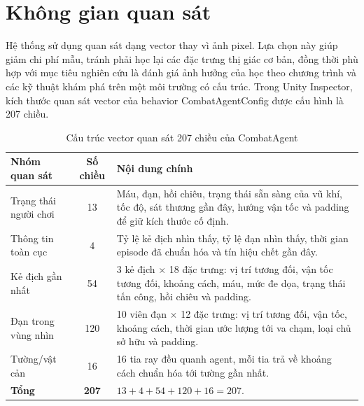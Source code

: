 \section{Không gian quan sát}

Hệ thống sử dụng quan sát dạng vector thay vì ảnh pixel. Lựa chọn này giúp giảm chi phí mẫu, tránh phải học lại các đặc trưng thị giác cơ bản, đồng thời phù hợp với mục tiêu nghiên cứu là đánh giá ảnh hưởng của học theo chương trình và các kỹ thuật khám phá trên một môi trường có cấu trúc. Trong Unity Inspector, kích thước quan sát vector của behavior CombatAgentConfig được cấu hình là 207 chiều.

\begin{table}[H]
    \centering
    \small
    \caption{Cấu trúc vector quan sát 207 chiều của CombatAgent}
    \label{tab:obs_207}
    \begin{tabular}{|p{4cm}|c|p{8cm}|}
        \hline
        \textbf{Nhóm quan sát} & \textbf{Số chiều} & \textbf{Nội dung chính} \\
        \hline
        Trạng thái người chơi & 13 & Máu, đạn, hồi chiêu, trạng thái sẵn sàng của vũ khí, tốc độ, sát thương gần đây, hướng vận tốc và padding để giữ kích thước cố định. \\
        \hline
        Thông tin toàn cục & 4 & Tỷ lệ kẻ địch nhìn thấy, tỷ lệ đạn nhìn thấy, thời gian episode đã chuẩn hóa và tín hiệu chết gần đây. \\
        \hline
        Kẻ địch gần nhất & 54 & 3 kẻ địch $\times$ 18 đặc trưng: vị trí tương đối, vận tốc tương đối, khoảng cách, máu, mức đe dọa, trạng thái tấn công, hồi chiêu và padding. \\
        \hline
        Đạn trong vùng nhìn & 120 & 10 viên đạn $\times$ 12 đặc trưng: vị trí tương đối, vận tốc, khoảng cách, thời gian ước lượng tới va chạm, loại chủ sở hữu và padding. \\
        \hline
        Tường/vật cản & 16 & 16 tia ray đều quanh agent, mỗi tia trả về khoảng cách chuẩn hóa tới tường gần nhất. \\
        \hline
        \textbf{Tổng} & \textbf{207} & $13 + 4 + 54 + 120 + 16 = 207$. \\
        \hline
    \end{tabular}
\end{table}

